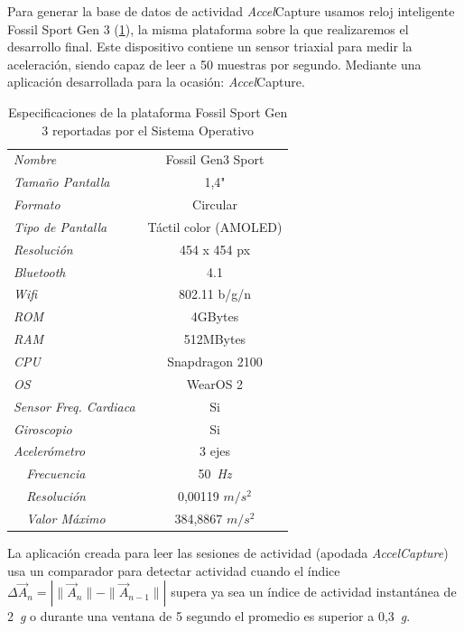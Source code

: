 \documentclass[11pt,a4paper,spanish,twocolumn]{article}
\def\accelcapture/{\textsl{\textsf{Accel}}\textsf{Capture}}
\def\g/{~\textsl{g}}
\def\hz/{~\textsl{Hz}}
\begin{document}
Para generar la base de datos de actividad \accelcapture/ usamos reloj inteligente Fossil Sport Gen 3 (\ref{tab:watch:specs}), la misma plataforma sobre la que realizaremos el desarrollo final. Este dispositivo contiene un sensor triaxial para medir la aceleración, siendo capaz de leer a 50 muestras por segundo. Mediante una aplicación desarrollada para la ocasión: \accelcapture/.

\begin{table}\caption{\label{tab:watch:specs} Especificaciones de la plataforma Fossil Sport Gen 3 reportadas por el Sistema Operativo}
	\begin{tabular}{lc}\toprule
  \emph{Nombre}              & Fossil Gen3 Sport \\
\emph{Tamaño Pantalla}     & 1,4" \\
\emph{Formato}              & Circular \\
\emph{Tipo de Pantalla}    & Táctil color (AMOLED) \\
\emph{Resolución}          & 454 x 454 px \\
\emph{Bluetooth}           & 4.1 \\
\emph{Wifi}                & 802.11 b/g/n \\
\emph{ROM}                 & 4GBytes \\
\emph{RAM}                 & 512MBytes \\
\emph{CPU}                 & Snapdragon 2100 \\
\emph{OS}                  & WearOS 2 \\
\emph{Sensor Freq. Cardiaca} & Si \\
\emph{Giroscopio}          & Si \\
\emph{Acelerómetro}         & 3 ejes \\
\emph{~~Frecuencia}         & 50\hz/ \\
\emph{~~Resolución}					& 0,00119 $m/s^2$ \\
\emph{~~Valor Máximo}				& 384,8867 $m/s^2$\\ \bottomrule
\end{tabular}
\end{table}

La aplicación creada para leer las sesiones de actividad (apodada \emph{AccelCapture}) usa un comparador para detectar actividad cuando el índice $\Delta \vec{A}_n = |\|\vec{A}_n\| -\|\vec{A }_{n-1}\||$ supera ya sea un índice de actividad instantánea de 2\g/ o durante una ventana de 5 segundo el promedio es superior a 0,3\g/.
\end{document}
